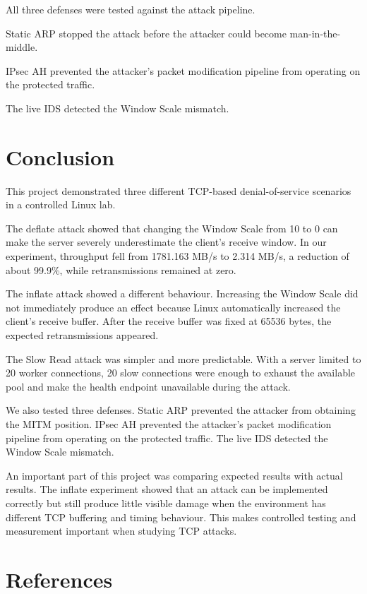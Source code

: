 \documentclass[11pt]{article}
\begin{document}
All three defenses were tested against the attack pipeline.

Static ARP stopped the attack before the attacker could become
man-in-the-middle.

IPsec AH prevented the attacker's packet modification pipeline from
operating on the protected traffic.

The live IDS detected the Window Scale mismatch.

\section{Conclusion}

This project demonstrated three different TCP-based denial-of-service
scenarios in a controlled Linux lab.

The deflate attack showed that changing the Window Scale from 10 to 0
can make the server severely underestimate the client's receive window.
In our experiment, throughput fell from 1781.163 MB/s to 2.314 MB/s,
a reduction of about 99.9\%, while retransmissions remained at zero.

The inflate attack showed a different behaviour. Increasing the
Window Scale did not immediately produce an effect because Linux
automatically increased the client's receive buffer. After the
receive buffer was fixed at 65536 bytes, the expected retransmissions
appeared.

The Slow Read attack was simpler and more predictable. With a server
limited to 20 worker connections, 20 slow connections were enough to
exhaust the available pool and make the health endpoint unavailable
during the attack.

We also tested three defenses. Static ARP prevented the attacker from
obtaining the MITM position. IPsec AH prevented the attacker's packet
modification pipeline from operating on the protected traffic. The
live IDS detected the Window Scale mismatch.

An important part of this project was comparing expected results with
actual results. The inflate experiment showed that an attack can be
implemented correctly but still produce little visible damage when
the environment has different TCP buffering and timing behaviour.
This makes controlled testing and measurement important when studying
TCP attacks.

\section{References}
\end{document}

